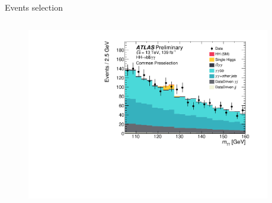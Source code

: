 \begin{frame}{Events selection}
\begin{columns}
\begin{figure}
    \centering
    \includegraphics[width=1.1\textwidth]{Part3/Img/myy_common.pdf}
\end{figure}
\begin{center}

\end{center}

\end{columns}

\end{frame}

